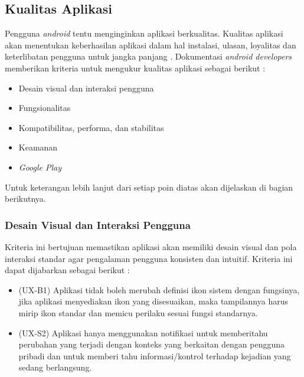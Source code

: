 \subsection{Kualitas Aplikasi}
Pengguna \textit{android} tentu menginginkan aplikasi berkualitas. Kualitas aplikasi akan menentukan keberhasilan aplikasi dalam hal instalasi, ulasan, loyalitas dan keterlibatan pengguna untuk jangka panjang \cite{androiddesign}. Dokumentasi \textit{android developers} memberikan kriteria untuk mengukur kualitas aplikasi sebagai berikut :
\begin{itemize}
    \item Desain visual dan interaksi pengguna
    \item Fungsionalitas
    \item Kompatibilitas, performa, dan stabilitas
    \item Keamanan   
    \item \textit{Google Play}
\end{itemize}
Untuk keterangan lebih lanjut dari setiap poin diatas akan dijelaskan di bagian berikutnya.

\subsubsection{Desain Visual dan Interaksi Pengguna}
Kriteria ini bertujuan memastikan aplikasi akan memiliki desain visual dan pola interaksi standar agar pengalaman pengguna konsisten dan intuitif\cite{androiddev}. Kriteria ini dapat dijabarkan sebagai berikut : 
\begin{itemize}
    \item (UX-B1) Aplikasi tidak boleh merubah definisi ikon sistem dengan fungsinya, jika aplikasi menyediakan ikon yang disesuaikan, maka tampilannya harus mirip ikon standar dan memicu perilaku sesuai fungsi standarnya. 
    \item (UX-S2) Aplikasi hanya menggunakan notifikasi untuk memberitahu perubahan yang terjadi dengan konteks yang berkaitan dengan pengguna pribadi dan untuk memberi tahu informasi/kontrol terhadap kejadian yang sedang berlangsung.
\end{itemize}

